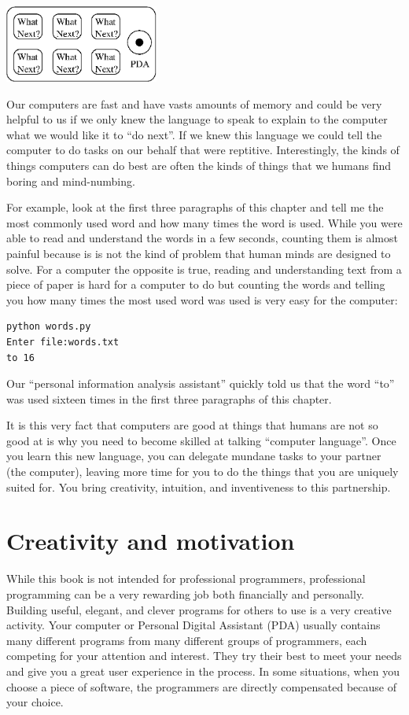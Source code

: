 \documentclass[10pt]{book}
\begin{document}
\beforefig
\centerline{\includegraphics[height=1.00in]{figs2/pda.eps}}
\afterfig


Our computers are fast and have vasts amounts of memory and 
could be very helpful to us if we only knew the language to
speak to explain to the computer what we would like it to 
``do next''.  If we knew this language we could tell the 
computer to do tasks on our behalf that were reptitive.  
Interestingly, the kinds of things computers can do best
are often the kinds of things that we humans find boring
and mind-numbing.

For example, look at the first three paragraphs of this
chapter and tell me the most commonly used word and how
many times the word is used.  While you were able to read
and understand the words in a few seconds, counting them
is almost painful because is is not the kind of problem 
that human minds are designed to solve.  For a computer
the opposite is true, reading and understanding text 
from a piece of paper is hard for a computer to do 
but counting the words and telling you how many times
the most used word was used is very easy for the
computer:

\beforeverb
\begin{verbatim}
python words.py
Enter file:words.txt
to 16
\end{verbatim}
\afterverb
%
Our ``personal information analysis assistant'' quickly 
told us that the word ``to'' was used sixteen times in the
first three paragraphs of this chapter.

It is this very fact that computers are good at things 
that humans are not so good at is why you need to become
skilled at talking ``computer language''.  Once you learn
this new language, you can delegate mundane tasks
to your partner (the computer), leaving more time 
for you to do the 
things that you are uniquely suited for.  You bring 
creativity, intuition, and inventiveness to this
partnership.  

\section{Creativity and motivation}

While this book is not intended for professional programmers, professional
programming can be a very rewarding job both financially and personally.
Building useful, elegant, and clever programs for others to use is a very
creative activity.  Your computer or Personal Digital Assistant (PDA) 
usually contains many different programs from many different groups of 
programmers, each competing for your attention and interest.  They try 
their best to meet your needs and give you a great user experience in the
process.   In some situations, when you choose a piece of software, the 
programmers are directly compensated because of your choice.
\end{document}
